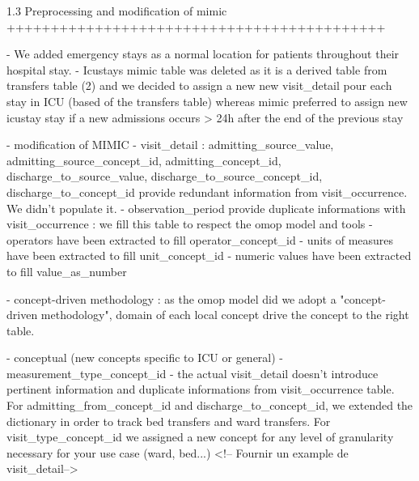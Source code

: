 1.3 Preprocessing and modification of mimic
+++++++++++++++++++++++++++++++++++++++++++

- We added emergency stays as a normal location for patients throughout their
  hospital stay.
- Icustays mimic table was deleted as it is a derived table from transfers
  table (2) and we decided to assign a new new visit_detail pour each stay in
  ICU (based of the transfers table) whereas mimic preferred to assign new
  icustay stay if a new admissions occurs > 24h after the end of the previous
  stay


- modification of MIMIC
	- visit_detail : admitting_source_value, admitting_source_concept_id, admitting_concept_id, discharge_to_source_value, discharge_to_source_concept_id, discharge_to_concept_id provide redundant information from visit_occurrence. We didn't populate it.
	- observation_period provide duplicate informations with visit_occurrence : we fill this table to respect the omop model and tools
	- operators have been extracted to fill operator_concept_id
	- units of measures have been extracted to fill unit_concept_id
	- numeric values have been extracted to fill value_as_number


- concept-driven methodology : as the omop model did we adopt a "concept-driven
  methodology", domain of each local concept drive the concept to the right
  table.

	- conceptual (new concepts specific to ICU or general)
		- measurement_type_concept_id
		- the actual visit_detail doesn't introduce pertinent information and duplicate informations from visit_occurrence table. For admitting_from_concept_id and discharge_to_concept_id, we extended the dictionary in order to track bed transfers and ward transfers. For visit_type_concept_id we assigned a new concept for any level of granularity necessary for your use case (ward, bed...) 
		<!-- Fournir un example de visit_detail-->


